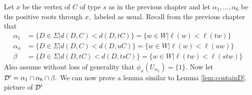 \documentclass[class=book, crop=false]{standalone}
\begin{document}
Let $x$ be the vertex of $C$ of type $s$ as in the previous chapter and let $\alpha_1,\dots,\alpha_6$ be the positive roots through $x,$ labeled as usual. Recall from the previous chapter that
	\begin{align*}
		\alpha_1&=\{D\in \Sigma|d(D,C)<d(D,tC)\}=\{w\in W|\ell(w)<\ell(tw)\}\\
		\alpha_n&=\{D\in \Sigma|d(D,C)<d(D,uC)\}=\{w\in W|\ell(w)<\ell(uw)\}\\
	\beta&=\{D\in \Sigma|d(D,tC)<d(D,tsC)\}=\{w\in W|\ell(tw)<\ell(stw)\}
	\end{align*}
Also assume without loss of generality that $\phi_x(U_{\alpha_5})=\{1\}.$ Now let $\mathcal{D}'=\alpha_1\cap \alpha_6\cap \beta.$ We can now prove a lemma similar to Lemma \ref{lem:containD}.\\
\Huge picture of $\mathcal{D}'$\normalsize\\
\end{document}

